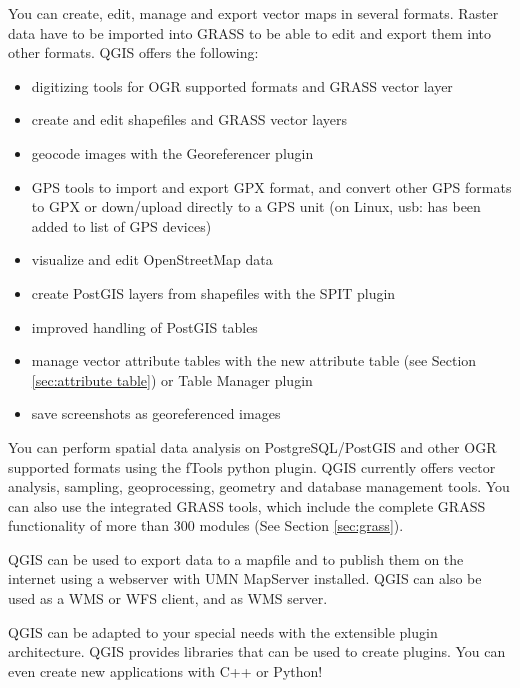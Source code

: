 
You can create, edit, manage and export vector maps in several formats. Raster data
have to be imported into GRASS to be able to edit and export them into other
formats. QGIS offers the following: 

\begin{itemize}[label=--]
\item digitizing tools for OGR supported formats and GRASS vector layer
\item create and edit shapefiles and GRASS vector layers
\item geocode images with the Georeferencer plugin
\item GPS tools to import and export GPX format, and convert other GPS
formats to GPX or down/upload directly to a GPS unit (on Linux, usb: has been added to list of GPS devices)
\item visualize and edit OpenStreetMap data
\item create PostGIS layers from shapefiles with the SPIT plugin 
\item improved handling of PostGIS tables
\item manage vector attribute tables with the new attribute table (see Section 
\ref{sec:attribute table}) or Table Manager plugin
\item save screenshots as georeferenced images
\end{itemize}


You can perform spatial data analysis on PostgreSQL/PostGIS and other OGR
supported formats using the fTools python plugin. QGIS currently offers
vector analysis, sampling, geoprocessing, geometry and database management
tools. You can also use the integrated GRASS tools, which 
include the complete GRASS functionality of more than 300 modules (See
Section \ref{sec:grass}).


QGIS can be used to export data to a mapfile and to publish them on the
internet using a webserver with UMN MapServer installed. QGIS can also
be used as a WMS or WFS client, and as WMS server. 


QGIS can be adapted to your special needs with the extensible
plugin architecture. QGIS provides libraries that can be used to create
plugins.  You can even create new applications with C++ or Python!

